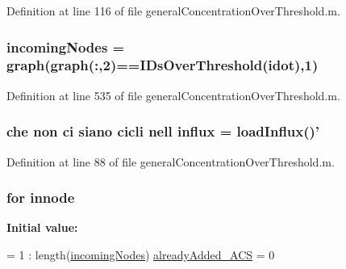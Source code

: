 Definition at line 116 of file general\+Concentration\+Over\+Threshold.\+m.

\hypertarget{a00028_a34c98e3306059653f2a214e5ef975e9c}{
\subsubsection[{incoming\+Nodes}]{\setlength{\rightskip}{0pt plus 5cm}incoming\+Nodes = {\bf graph}({\bf graph}(\+:,2)=={\bf I\+Ds\+Over\+Threshold}(idot),1)}}\label{a00028_a34c98e3306059653f2a214e5ef975e9c}


Definition at line 535 of file general\+Concentration\+Over\+Threshold.\+m.

\hypertarget{a00028_a637d2af7e7b03600bcaf1931b999e3fc}{
\subsubsection[{influx}]{ che non ci siano cicli nell influx = load\+Influx()'}}\label{a00028_a637d2af7e7b03600bcaf1931b999e3fc}


Definition at line 88 of file general\+Concentration\+Over\+Threshold.\+m.

\hypertarget{a00028_a21f06040cb68a910280e04d4c59d980e}{
\subsubsection[{innode}]{\setlength{\rightskip}{0pt plus 5cm}for innode}}\label{a00028_a21f06040cb68a910280e04d4c59d980e}
{\bfseries Initial value\+:}
\begin{DoxyCode}
= 1 : length(\hyperlink{a00028_a34c98e3306059653f2a214e5ef975e9c}{incomingNodes})
                            \hyperlink{a00028_a77c2cda04a3103708011753a77dceda3}{alreadyAdded\_ACS} = 0
\end{DoxyCode}


